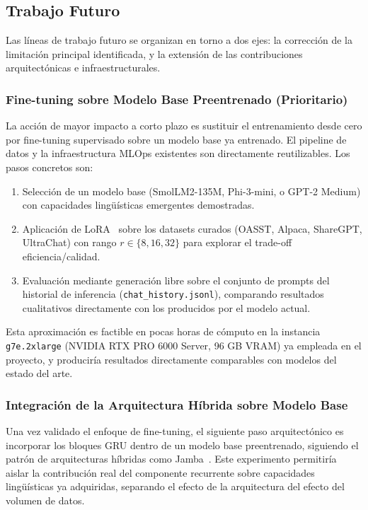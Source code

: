 \subsection{Trabajo Futuro}

Las líneas de trabajo futuro se organizan en torno a dos ejes: la corrección de la limitación principal identificada, y la extensión de las contribuciones arquitectónicas e infraestructurales.

\subsubsection{Fine-tuning sobre Modelo Base Preentrenado (Prioritario)}

La acción de mayor impacto a corto plazo es sustituir el entrenamiento desde cero por fine-tuning supervisado sobre un modelo base ya entrenado. El pipeline de datos y la infraestructura MLOps existentes son directamente reutilizables. Los pasos concretos son:

\begin{enumerate}
    \item Selección de un modelo base (SmolLM2-135M, Phi-3-mini, o GPT-2 Medium) con capacidades lingüísticas emergentes demostradas.
    \item Aplicación de LoRA~\cite{hu2021lora} sobre los datasets curados (OASST, Alpaca, ShareGPT, UltraChat) con rango $r \in \{8, 16, 32\}$ para explorar el trade-off eficiencia/calidad.
    \item Evaluación mediante generación libre sobre el conjunto de prompts del historial de inferencia (\texttt{chat\_history.jsonl}), comparando resultados cualitativos directamente con los producidos por el modelo actual.
\end{enumerate}

Esta aproximación es factible en pocas horas de cómputo en la instancia \texttt{g7e.2xlarge} (NVIDIA RTX PRO 6000 Server, 96 GB VRAM) ya empleada en el proyecto, y produciría resultados directamente comparables con modelos del estado del arte.

\subsubsection{Integración de la Arquitectura Híbrida sobre Modelo Base}

Una vez validado el enfoque de fine-tuning, el siguiente paso arquitectónico es incorporar los bloques GRU dentro de un modelo base preentrenado, siguiendo el patrón de arquitecturas híbridas como Jamba~\cite{lieber2024jamba}. Este experimento permitiría aislar la contribución real del componente recurrente sobre capacidades lingüísticas ya adquiridas, separando el efecto de la arquitectura del efecto del volumen de datos.

